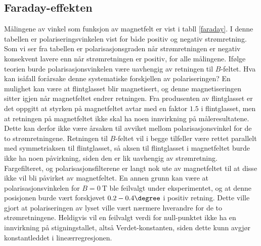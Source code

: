 \documentclass[%
 reprint,
nofootinbib,
aps,
]{revtex4-1}
\begin{document}
\subsection{Faraday-effekten}
Målingene av vinkel som funksjon av magnetfelt er vist i tabll \vref{faraday}. I denne tabellen er polariseringsvinkelen vist for både positiv og negativ strømretning. Som vi ser fra tabellen er polarisasjonsgraden når strømretningen er negativ konsekvent lavere enn når strømretningen er positiv, for alle målingene. Ifølge teorien burde polarisasjonsvinkelen være uavhengig av retningen til $B$-feltet. Hva kan isåfall forårsake denne systematiske forskjellen av polariseringen? En mulighet kan være at flintglasset blir magnetisert, og denne magnetiseringen sitter igjen når magnetfeltet endrer retningen. Fra produsenten av flintglasset er det oppgitt at styrken på magnetfeltet avtar med en faktor $1.5$ i flintglasset, men at retningen på magnetfeltet ikke skal ha noen innvirkning på måleresultatene. Dette kan derfor ikke være årsaken til avviket mellom polarisasjonsvinkel for de to strømretningene. Retningen til $B$-feltet vil i begge tilfeller være rettet parallelt med symmetriaksen til flintglasset, så aksen til flintglasset i magnetfeltet burde ikke ha noen påvirkning, siden den er lik uavhengig av strømretning. Fargefilteret, og polarisasjonsfilterene er langt nok ute av magnetfeltet til at disse ikke vil bli påvirket av magnetfeltet. En annen grunn kan være at polarisasjonsvinkelen for $B=\SI{0}{\tesla}$ ble feilvalgt under eksperimentet, og at denne posisjonen burde vært forskjøvet $0.2-0.4\degree$ i positiv retning. Dette ville gjort at polariseringen av lyset ville vært nærmere hverandre for de to strømretningene. Heldigvis vil en feilvalgt verdi for null-punktet ikke ha en innvirkning på stigningstallet, altså Verdet-konstanten, siden dette kunn avgjør konstantleddet i lineærregresjonen.\par
\end{document}
